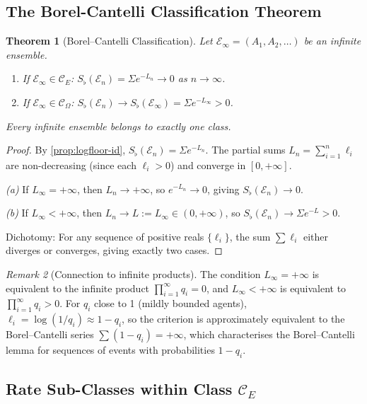 \documentclass[twocolumn,11pt,a4paper]{article}
\newtheorem{theorem}{Theorem}[section]
\theoremstyle{remark}
\newtheorem{remark}[theorem]{Remark}
\newcommand{\Sflat}{S_{\flat}}
\newcommand{\Ens}{\mathcal{E}}
\newcommand{\ClassE}{\mathcal{C}_E}       %
\newcommand{\ClassO}{\mathcal{C}_\Omega}  %
\newcommand{\logfl}{\ell}                 %
\newcommand{\Logfl}{L}                    %
\begin{document}
\subsection{The Borel-Cantelli Classification Theorem}
\label{sec:classes:bc}

\begin{theorem}[Borel--Cantelli Classification]
\label{thm:bc-classification}
Let $\Ens_\infty = (A_1,A_2,\ldots)$ be an infinite ensemble.
\begin{enumerate}[label=\textup{(\alph*)}]
\item If $\Ens_\infty \in \ClassE$: $\Sflat(\Ens_n) = \Sigma e^{-\Logfl_n} \to 0$
  as $n\to\infty$.
\item If $\Ens_\infty \in \ClassO$: $\Sflat(\Ens_n) \to
  \Sflat(\Ens_\infty) = \Sigma e^{-\Logfl_\infty} > 0$.
\end{enumerate}
Every infinite ensemble belongs to exactly one class.
\end{theorem}
\begin{proof}
By \cref{prop:logfloor-id}, $\Sflat(\Ens_n) = \Sigma e^{-\Logfl_n}$.
The partial sums $\Logfl_n = \sum_{i=1}^n \logfl_i$ are non-decreasing
(since each $\logfl_i>0$) and converge in $[0,+\infty]$.

\textit{(a)} If $\Logfl_\infty = +\infty$, then $\Logfl_n \to +\infty$,
so $e^{-\Logfl_n} \to 0$, giving $\Sflat(\Ens_n) \to 0$.

\textit{(b)} If $\Logfl_\infty < +\infty$, then $\Logfl_n \to L :=
\Logfl_\infty \in (0,+\infty)$, so $\Sflat(\Ens_n) \to \Sigma e^{-L} > 0$.

Dichotomy: For any sequence of positive reals $\{\logfl_i\}$, the sum
$\sum \logfl_i$ either diverges or converges, giving exactly two cases.
\end{proof}

\begin{remark}[Connection to infinite products]
The condition $\Logfl_\infty = +\infty$ is equivalent to the infinite product
$\prod_{i=1}^\infty q_i = 0$, and $\Logfl_\infty < +\infty$ is equivalent to
$\prod_{i=1}^\infty q_i > 0$.  For $q_i$ close to 1 (mildly bounded agents),
$\logfl_i = \log(1/q_i) \approx 1-q_i$, so the criterion is approximately
equivalent to the Borel--Cantelli series $\sum(1-q_i) = +\infty$, which
characterises the Borel--Cantelli lemma for sequences of events with
probabilities $1-q_i$.
\end{remark}

\subsection{Rate Sub-Classes within Class $\ClassE$}
\label{sec:classes:sub}
\end{document}
